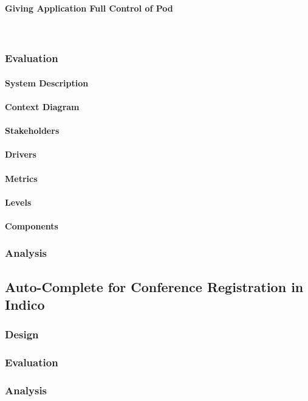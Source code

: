 \paragraph{Giving Application Full Control of Pod}\mbox{}\\

\subsubsection{Evaluation}

\paragraph{System Description}
\paragraph{Context Diagram}
\paragraph{Stakeholders}
\paragraph{Drivers}
\paragraph{Metrics}
\paragraph{Levels}
\paragraph{Components}


\subsubsection{Analysis}

\subsection{Auto-Complete for Conference Registration in Indico}

\subsubsection{Design}
\subsubsection{Evaluation}
\subsubsection{Analysis}



\section{}